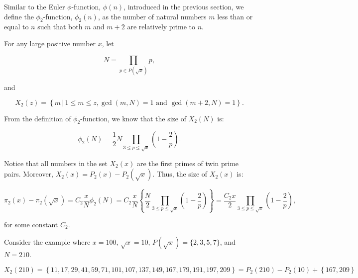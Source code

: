 \documentclass{article}
\begin{document}
Similar to the Euler \( \phi \)-function, \( \phi(n) \), introduced in the previous section, we define the \( \phi_{2} \)-function, \( \phi_{2}(n) \), as the number of natural numbers \( m \) less than or equal to \( n \) such that both \( m \) and \( m+2 \) are relatively prime to \( n \).
\vspace{1\baselineskip}

For any large positive number \( x \), let 

\begin{equation}
N = \prod_{p \in P(\sqrt{x})} p,
\end{equation}

and

\begin{equation}
X_{2}(z) = \left\{ m \, | \, 1 \leq m \leq z, \gcd(m,N) = 1 \text{ and } \gcd(m+2,N) = 1 \right\}.
\end{equation}
\vspace{1\baselineskip}

From the definition of \( \phi_{2} \)-function, we know that the size of \( X_{2}(N) \) is:


\begin{equation}
 \phi_{2}\left(N\right) = \frac{1}{2} N\prod_{3\leq p\leq\sqrt{x}}^{}(1-\frac{2}{p} ) .
\end{equation}
\vspace{1\baselineskip}

Notice that all numbers in the set \( X_{2}(x) \) are the first primes of twin prime pairs. Moreover, \( X_{2}(x) = P_{2}(x) - P_{2}(\sqrt{x}) \). Thus, the size of \( X_{2}(x) \) is:

\begin{equation}
\pi_{2}(x) - \pi_{2}(\sqrt{x}) = C_{2} \frac{x}{N} \phi_{2}(N) = C_{2} \frac{x}{N} \left\{ \frac{N}{2} \prod_{3 \leq p \leq \sqrt{x}} \left(1-\frac{2}{p}\right) \right\} = \frac{C_{2}x}{2} \prod_{3 \leq p \leq \sqrt{x}} \left(1-\frac{2}{p}\right),
\end{equation}

for some constant \( C_{2} \).
\vspace{1\baselineskip}

Consider the example where \( x = 100 \), \( \sqrt{x} = 10 \), \( P(\sqrt{x}) = \{2,3,5,7\} \), and \( N = 210 \).

\begin{equation}
X_{2}\left(210\right) =\left\{ 11, 17, 29, 41, 59, 71, 101, 107, 137, 149, 167, 179, 191, 197, 209\right\}  = P_{2}\left(210\right)-P_{2}\left(10\right)+\left\{ 167, 209\right\} 
\end{equation}
\end{document}
